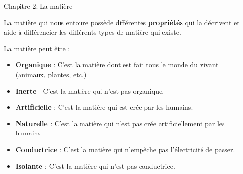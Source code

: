 \documentclass[24pt]{article}
\newcommand{\titre}{Chapitre 2: La matière} %
\begin{document}
\thispagestyle{fancy}
\cfoot{}

\begin{titlebox}{\titre}
    \setlength\parindent{4pt} %
    \setlength\parskip{5pt} 

    La matière qui nous entoure possède différentes \textbf{\color{DarkRed} {propriétés}} 
    qui la décrivent et aide à différencier les différents types de matière qui existe.

    La matière peut être : 
    \begin{itemize}
        \item \textbf{\color{DarkRed} {Organique}} : 
        C'est la matière dont est fait tous le monde du vivant
        (animaux, plantes, etc.)
        \item \textbf{\color{DarkRed} {Inerte }} :
        C'est la matière qui n'est pas organique.
        \item \textbf{\color{DarkRed} {Artificielle}} : 
        C'est la matière qui est crée par les humains.
        \item \textbf{\color{DarkRed} {Naturelle }} :
        C'est la matière qui n'est pas crée artificiellement par les humains.
        \item \textbf{\color{DarkRed} {Conductrice}} :
        C'est la matière qui n'empêche pas l'électricité de passer.
        \item \textbf{\color{DarkRed} {Isolante }} :
        C'est la matière qui n'est pas conductrice.
    \end{itemize}
    
    \vspace{50pt}
 

\end{titlebox}
\end{document}
